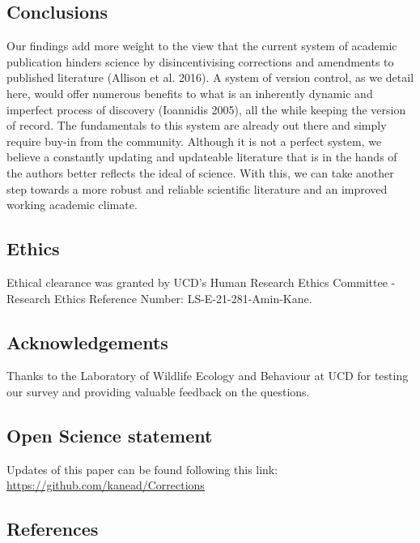 \documentclass[
]{article}
\begin{document}
\hypertarget{conclusions}{%
\subsection{Conclusions}\label{conclusions}}

Our findings add more weight to the view that the current system of
academic publication hinders science by disincentivising corrections and
amendments to published literature (Allison et al. 2016). A system of
version control, as we detail here, would offer numerous benefits to
what is an inherently dynamic and imperfect process of discovery
(Ioannidis 2005), all the while keeping the version of record. The
fundamentals to this system are already out there and simply require
buy-in from the community. Although it is not a perfect system, we
believe a constantly updating and updateable literature that is in the
hands of the authors better reflects the ideal of science. With this, we
can take another step towards a more robust and reliable scientific
literature and an improved working academic climate.

\hypertarget{ethics}{%
\subsection{Ethics}\label{ethics}}

Ethical clearance was granted by UCD's Human Research Ethics Committee -
Research Ethics Reference Number: LS-E-21-281-Amin-Kane.

\hypertarget{acknowledgements}{%
\subsection{Acknowledgements}\label{acknowledgements}}

Thanks to the Laboratory of Wildlife Ecology and Behaviour at UCD for
testing our survey and providing valuable feedback on the questions.

\hypertarget{open-science-statement}{%
\subsection{Open Science statement}\label{open-science-statement}}

Updates of this paper can be found following this link:
\url{https://github.com/kanead/Corrections}

\hypertarget{references}{%
\subsection*{References}\label{references}}
\end{document}
